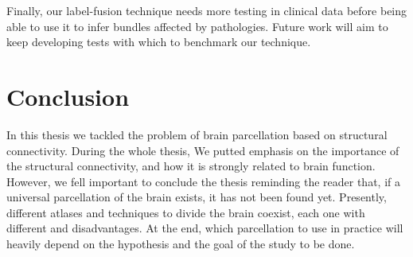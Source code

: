 Finally, our label-fusion technique needs more testing in clinical data before
being able to use it to infer bundles affected by pathologies. Future work
will aim to keep developing tests with which to benchmark our technique.

\section{Conclusion}
In this thesis we tackled the problem of brain parcellation based on structural
connectivity. During the whole thesis, We putted emphasis on the importance
of the structural connectivity, and how it is strongly related to brain function.
However, we fell important to conclude the thesis reminding the reader that,
if a universal parcellation of the brain exists, it has not been found yet.
Presently, different atlases and techniques to divide the brain coexist, each
one with different and disadvantages. At the end, which parcellation to use in
practice will heavily depend on the hypothesis and the goal of the study to be
done.


%
%
% 

%

